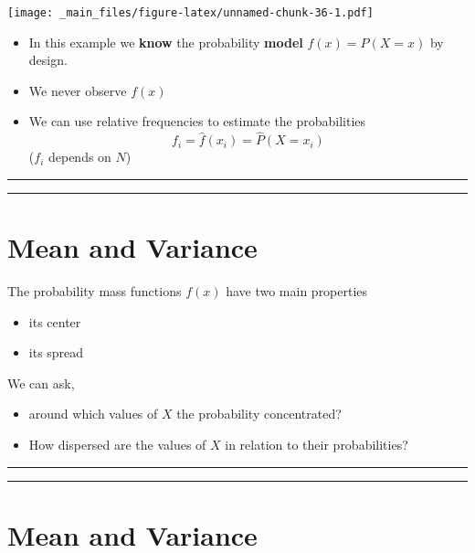 \documentclass[
]{book}
\providecommand{\tightlist}{%
  \setlength{\itemsep}{0pt}\setlength{\parskip}{0pt}}
\begin{document}
\texttt{[image: \_main\_files/figure-latex/unnamed-chunk-36-1.pdf]}

\begin{itemize}
\tightlist
\item
  In this example we \textbf{know} the probability \textbf{model} \(f(x)=P(X=x)\) by design.
\item
  We never observe \(f(x)\)
\item
  We can use relative frequencies to estimate the probabilities
  \[f_i = \hat{f}(x_i)=\hat{P}(X=x_i)\] (\(f_i\) depends on \(N\))
\end{itemize}

\begin{center}\rule{0.5\linewidth}{0.5pt}\end{center}

\begin{center}\rule{0.5\linewidth}{0.5pt}\end{center}

\hypertarget{mean-and-variance}{%
\section{Mean and Variance}\label{mean-and-variance}}

The probability mass functions \(f(x)\) have two main properties

\begin{itemize}
\tightlist
\item
  its center
\item
  its spread
\end{itemize}

We can ask,

\begin{itemize}
\item
  around which values of \(X\) the probability concentrated?
\item
  How dispersed are the values of \(X\) in relation to their probabilities?
\end{itemize}

\begin{center}\rule{0.5\linewidth}{0.5pt}\end{center}

\begin{center}\rule{0.5\linewidth}{0.5pt}\end{center}

\hypertarget{mean-and-variance-1}{%
\section{Mean and Variance}\label{mean-and-variance-1}}
\end{document}
